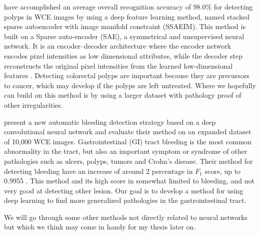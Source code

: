 \documentclass[thesis.tex]{subfiles}
\begin{document}
\medbreak 
\citeauthor*{DeepLearning17} have accomplished an average overall recognition accuracy of 98.0\% for detecting polyps in WCE images by using a deep feature learning method, named stacked sparse autoencoder with image manifold constraint (SSAEIM). This method is built on a Sparse auto-encoder (SAE), a symmetrical and unsupervised neural network. It is an encoder–decoder architecture where the encoder network encodes pixel intensities as low dimensional attributes, while the decoder step reconstructs the original pixel intensities from the learned low-dimensional features \cite{DeepLearning17}. Detecting colorectal polyps are important because they are precursors to cancer, which may develop if the polyps are left untreated. Where we hopefully can build on this method is by using a larger dataset with pathology proof of other irregularities.

\medbreak
\citeauthor*{DeepConvolutional16} present a new automatic bleeding detection strategy based on a deep convolutional neural network and evaluate their method on an expanded dataset of 10,000 WCE images. Gastrointestinal (GI) tract bleeding is the most common abnormality in the tract, but also an important symptom or syndrome of other pathologies such as ulcers, polyps, tumors and Crohn's disease. Their method for detecting bleeding have an increase of around 2 percentage in $F_1$ score, up to 0.9955 \cite{DeepConvolutional16}. This method and its high score in somewhat limited to bleeding, and not very good at detecting other lesion. 
Our goal is to develop a method for using deep learning to find more generalized pathologies in the gastrointestinal tract.

\medbreak
We will go through some other methods not directly related to neural networks but which we think may come in handy for my thesis later on. 
\end{document}
